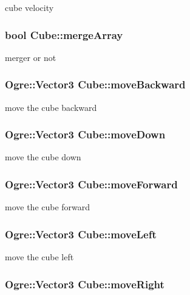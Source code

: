 cube velocity \hypertarget{class_cube_ad3d76d07ee2fc90ede8dfe807480002f}{
\subsubsection[{merge\-Array}]{\setlength{\rightskip}{0pt plus 5cm}bool Cube\-::merge\-Array}}\label{class_cube_ad3d76d07ee2fc90ede8dfe807480002f}
merger or not \hypertarget{class_cube_aa7536967e2fdaaaa68a01d380ae5e2ab}{
\subsubsection[{move\-Backward}]{\setlength{\rightskip}{0pt plus 5cm}Ogre\-::\-Vector3 Cube\-::move\-Backward}}\label{class_cube_aa7536967e2fdaaaa68a01d380ae5e2ab}
move the cube backward \hypertarget{class_cube_a187bae124402e077fd574b245d029721}{
\subsubsection[{move\-Down}]{\setlength{\rightskip}{0pt plus 5cm}Ogre\-::\-Vector3 Cube\-::move\-Down}}\label{class_cube_a187bae124402e077fd574b245d029721}
move the cube down \hypertarget{class_cube_a753844c06abc292f38ae4e496d192cc6}{
\subsubsection[{move\-Forward}]{\setlength{\rightskip}{0pt plus 5cm}Ogre\-::\-Vector3 Cube\-::move\-Forward}}\label{class_cube_a753844c06abc292f38ae4e496d192cc6}
move the cube forward \hypertarget{class_cube_a826e1bab8cac54c8b8fdbded40deb5c4}{
\subsubsection[{move\-Left}]{\setlength{\rightskip}{0pt plus 5cm}Ogre\-::\-Vector3 Cube\-::move\-Left}}\label{class_cube_a826e1bab8cac54c8b8fdbded40deb5c4}
move the cube left \hypertarget{class_cube_a1fc7acbf2fea6ef489c16634f316f8c7}{
\subsubsection[{move\-Right}]{\setlength{\rightskip}{0pt plus 5cm}Ogre\-::\-Vector3 Cube\-::move\-Right}}\label{class_cube_a1fc7acbf2fea6ef489c16634f316f8c7}

